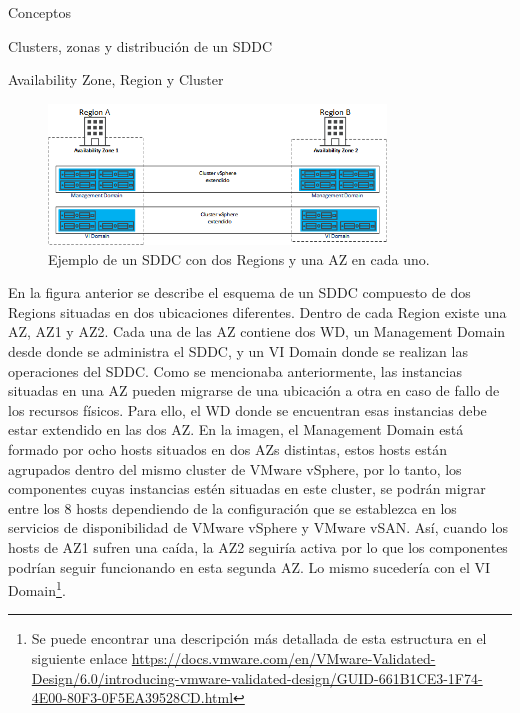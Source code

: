 \begin{section}{Conceptos}
\begin{subsection}{Clusters, zonas y distribución de un SDDC}
\begin{subsubsection}{Availability Zone, Region y Cluster}
\begin{figure}[h!]
  \centering
  \includegraphics[width=0.8\textwidth]{imaxes/conceptosPrevios/AZRegionCluster.png}
  \caption{Ejemplo de un SDDC con dos Regions y una AZ en cada uno.}
  \label{fig:az-region-cluster}
\end{figure}
En la figura anterior se describe el esquema de un SDDC compuesto de dos Regions situadas en dos ubicaciones diferentes. Dentro de cada Region existe una AZ, AZ1 y AZ2. Cada una de las AZ contiene dos WD, un Management Domain desde donde se administra el SDDC, y un VI Domain donde se realizan las operaciones del SDDC. Como se mencionaba anteriormente, las instancias situadas en una AZ pueden migrarse de una ubicación a otra en caso de fallo de los recursos físicos. Para ello, el WD donde se encuentran esas instancias debe estar extendido en las dos AZ. En la imagen, el Management Domain está formado por ocho hosts situados en dos AZs distintas, estos hosts están agrupados dentro del mismo cluster de VMware vSphere, por lo tanto, los componentes cuyas instancias estén situadas en este cluster, se podrán migrar entre los 8 hosts dependiendo de la configuración que se establezca en los servicios de disponibilidad de VMware vSphere y VMware vSAN. Así, cuando los hosts de AZ1 sufren una caída, la AZ2 seguiría activa por lo que los componentes podrían seguir funcionando en esta segunda AZ. Lo mismo sucedería con el VI Domain\footnote{Se puede encontrar una descripción más detallada de esta estructura en el siguiente enlace \url{https://docs.vmware.com/en/VMware-Validated-Design/6.0/introducing-vmware-validated-design/GUID-661B1CE3-1F74-4E00-80F3-0F5EA39528CD.html}}.



\end{subsubsection}
\end{subsection}
\end{section}
